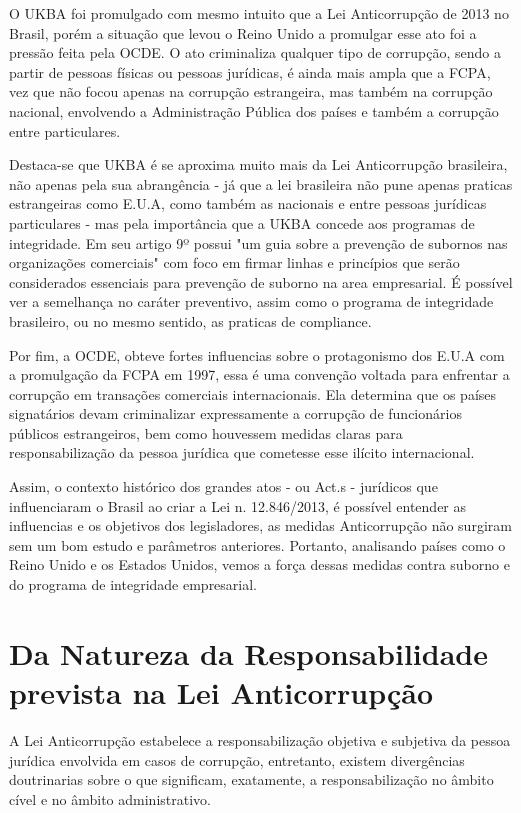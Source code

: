 O UKBA foi promulgado com mesmo intuito que a Lei Anticorrupção de 2013 no Brasil, porém a situação que levou o Reino Unido a promulgar esse ato foi a pressão feita pela OCDE. O ato criminaliza qualquer tipo de corrupção, sendo a partir de pessoas físicas ou pessoas jurídicas, é ainda mais ampla que a FCPA, vez que não focou apenas na corrupção estrangeira, mas também na corrupção nacional, envolvendo a Administração Pública dos países e também a corrupção entre particulares. 

Destaca-se que UKBA é se aproxima muito mais da Lei Anticorrupção brasileira, não apenas pela sua abrangência - já que a lei brasileira não pune apenas praticas estrangeiras como E.U.A, como também as nacionais e entre pessoas jurídicas particulares - mas pela importância que a UKBA concede aos programas de integridade. Em seu artigo 9º possui "um guia sobre a prevenção de subornos nas organizações comerciais" com foco em firmar linhas e princípios que serão considerados essenciais para prevenção de suborno na area empresarial. É possível ver a semelhança no caráter preventivo, assim como o programa de integridade brasileiro, ou no mesmo sentido, as praticas de compliance. 

Por fim, a OCDE, obteve fortes influencias sobre o protagonismo dos E.U.A com a promulgação da FCPA em 1997, essa é uma convenção voltada para enfrentar a corrupção em transações comerciais internacionais. Ela determina que os países signatários devam criminalizar expressamente a corrupção de funcionários públicos estrangeiros, bem como houvessem medidas claras para responsabilização da pessoa jurídica que cometesse esse ilícito internacional. 

Assim, o contexto histórico dos grandes atos - ou Act.s - jurídicos que influenciaram o Brasil ao criar a Lei n. 12.846/2013, é possível entender as influencias e os objetivos dos legisladores, as medidas Anticorrupção não surgiram sem um bom estudo e parâmetros anteriores. Portanto, analisando países como o Reino Unido e os Estados Unidos, vemos a força dessas medidas contra suborno e do programa de integridade empresarial. 

\section{Da Natureza da Responsabilidade prevista na Lei Anticorrupção}

A Lei Anticorrupção estabelece a responsabilização objetiva e subjetiva da pessoa jurídica envolvida em casos de corrupção, entretanto, existem divergências doutrinarias sobre o que significam, exatamente, a responsabilização no âmbito cível e no âmbito administrativo. 

